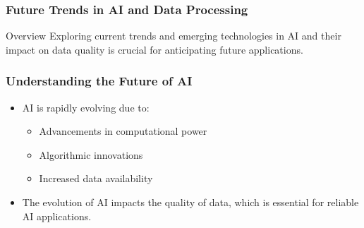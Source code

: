 \documentclass[aspectratio=169]{beamer}
\begin{document}
\begin{frame}[fragile]
    \frametitle{Future Trends in AI and Data Processing}
    \begin{block}{Overview}
        Exploring current trends and emerging technologies in AI and their impact on data quality is crucial for anticipating future applications. 
    \end{block}
\end{frame}

\begin{frame}[fragile]
    \frametitle{Understanding the Future of AI}
    \begin{itemize}
        \item AI is rapidly evolving due to:
            \begin{itemize}
                \item Advancements in computational power
                \item Algorithmic innovations
                \item Increased data availability
            \end{itemize}
        \item The evolution of AI impacts the quality of data, which is essential for reliable AI applications.
    \end{itemize}
\end{frame}
\end{document}
